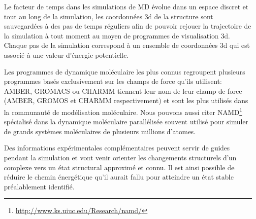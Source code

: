 
Le facteur de temps dans les simulations de MD évolue dans un espace discret et tout au long de la simulation, les coordonnées 3d de la structure sont sauvegardées à des pas de temps réguliers afin de pouvoir rejouer la trajectoire de la simulation à tout moment au moyen de programmes de visualisation 3d. Chaque pas de la simulation correspond à un ensemble de coordonnées 3d qui est associé à une valeur d'énergie potentielle.

Les programmes de dynamique moléculaire les plus connus regroupent plusieurs programmes basés exclusivement sur les champs de force qu'ils utilisent: AMBER, GROMACS ou CHARMM tiennent leur nom de leur champ de force (AMBER, GROMOS et CHARMM respectivement) et sont les plus utilisés dans la communauté de modélisation moléculaire. Nous pouvons aussi citer NAMD\footnote{\url{http://www.ks.uiuc.edu/Research/namd/}} \cite{phillips2005scalable} spécialisé dans la dynamique moléculaire parallélisée souvent utilisé pour simuler de grands systèmes moléculaires de plusieurs millions d'atomes.

Des informations expérimentales complémentaires peuvent servir de guides pendant la simulation et vont venir orienter les changements structurels d'un complexe vers un état structural approximé et connu. Il est ainsi possible de réduire le chemin énergétique qu'il aurait fallu pour atteindre un état stable préalablement identifié.


